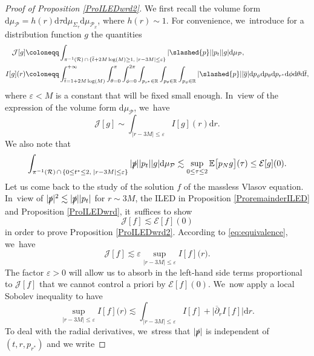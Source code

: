 \documentclass[JEP,XML,SOM,Unicode,published]{cedram}
\let\epsilon\varepsilon
\theoremstyle{plain}
\theoremstyle{definition}
\newcommand\R{{\mathbb{R}}}
\newcommand\dr{{\mathrm{d}}}
\begin{document}
\begin{proof}[Proof of Proposition \ref{ProILEDwrd2}]
We first recall the volume form $\dr \mu_{\mathcal{P}} =h(r) \dr \tau \dr \mu_{\Sigma_\tau} \dr \mu_{\mathcal{P}_x}$, where $h(r) \sim 1$. For convenience, we~introduce for a distribution function $g$ the quantities
\begin{align*}
\mathcal{J}[g]&\coloneqq \int_{\pi^{-1}(\mathcal{R})\,\cap \,\{ \overline{t}+2M\log(M) \geq 1, \; |r-3M| \leq \epsilon \} } |\slashed{p}||p_t||g| \dr \mu_{\mathcal{P}}, \\
I[g] (r)& \coloneqq \int_{\overline{t}=1+2M\log(M)}^{+ \infty} \int_{\theta=0}^\pi \int_{\phi =0}^{2\pi} \int_{p_{r^*} \in \R} \int_{p_\theta \in \R} \int_{p_\phi \in \R} |\slashed{p}||\overline{g}| \dr p_{\phi} \dr p_{\theta} \dr p_{r^*} \dr \phi \dr \theta \dr \overline{t},
\end{align*}
where $\epsilon <M$ is a constant that will be fixed small enough. In~view of the expression of the volume form $\dr \mu_{\mathcal{P}}$, we~have
\begin{equation}\label{eq:equivalence}
\mathcal{J}[g] \sim \int_{|r-3M|\leq \epsilon} I[g](r) \dr r.
\end{equation}
We also note that
\[
\int_{\pi^{-1}(\mathcal{R})\,\cap\, \{ 0 \leq t^* \leq 2, \; |r-3M| \leq \epsilon \} } |\slashed{p}||p_t||g| \dr \mu_{\mathcal{P}} \lesssim \sup_{0 \leq \tau \leq 2} \mathbb{E}\bigl[p_N g \bigr](\tau) \leq \mathcal{E}[g](0).
\]
Let us come back to the study of the solution $f$ of the massless Vlasov equation. In~view of $|\slashed{p}|^2 \lesssim |\slashed{p}||p_t|$ for $r \sim 3M$, the ILED in Proposition \ref{ProremainderILED} and Proposition \ref{ProILEDwrd}, it~suffices to show
\begin{equation}\label{eq:toprove}
\mathcal{J}[f] \lesssim \mathcal{E}[f](0)
\end{equation}
in order to prove Proposition \ref{ProILEDwrd2}. According to \eqref{eq:equivalence}, we~have
\begin{equation}\label{equa:auxi}
\mathcal{J}[f] \lesssim \epsilon \sup_{|r-3M| \leq \epsilon } I[f]\bigl(r\bigr).
\end{equation}
The factor $\epsilon>0$ will allow us to absorb in the left-hand side terms proportional to $\mathcal{J}[f]$ that we cannot control a priori by $\mathcal{E}[f](0)$. We~now apply a local Sobolev inequality to have
\[
\sup_{|r-3M| \leq \epsilon } I[f]\bigl(r\bigr) \lesssim \int_{|r-3M| \leq \epsilon } I[f] + \big| \overline{\partial}_r I[f] \big| \dr r.
\]
To deal with the radial derivatives, we~stress that $|\slashed{p}|$ is independent of $(t,r,p_{r^*})$ and we write

\end{proof}
\end{document}
